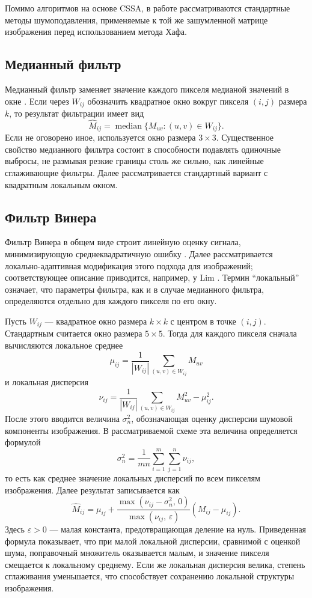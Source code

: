Помимо алгоритмов на основе CSSA, в работе рассматриваются стандартные методы шумоподавления, применяемые к той же зашумленной матрице изображения перед использованием метода Хафа.

\subsection*{Медианный фильтр}

Медианный фильтр заменяет значение каждого пикселя медианой значений в окне \cite{huang1979}. Если через $W_{ij}$ обозначить квадратное окно вокруг пикселя $(i,j)$ размера $k$, то результат фильтрации имеет вид
\[
\widehat{M}_{ij} = \operatorname{median}\{M_{uv} \colon (u,v)\in W_{ij}\}.
\]
Если не оговорено иное, используется окно размера \(3\times 3\).
Существенное свойство медианного фильтра состоит в способности подавлять одиночные выбросы, не размывая резкие границы столь же сильно, как линейные сглаживающие фильтры. Далее рассматривается стандартный вариант с квадратным локальным окном.

\subsection*{Фильтр Винера}

Фильтр Винера в общем виде строит линейную оценку сигнала, минимизирующую среднеквадратичную ошибку \cite{wiener1949}. Далее рассматривается локально-адаптивная модификация этого подхода для изображений; соответствующее описание приводится, например, у Lim \cite{lim1990}. Термин ``локальный'' означает, что параметры фильтра, как и в случае медианного фильтра, определяются отдельно для каждого пикселя по его окну.

Пусть $W_{ij}$ --- квадратное окно размера $k\times k$ с центром в точке $(i,j)$. Стандартным считается окно размера \(5\times 5\). Тогда для каждого пикселя сначала вычисляются локальное среднее
\[
\mu_{ij} = \frac{1}{|W_{ij}|}\sum_{(u,v)\in W_{ij}} M_{uv}
\]
и локальная дисперсия
\[
\nu_{ij} =
\frac{1}{|W_{ij}|}\sum_{(u,v)\in W_{ij}} M_{uv}^2 - \mu_{ij}^2.
\]
После этого вводится величина $\sigma_n^2$, обозначающая оценку дисперсии шумовой компоненты изображения. В рассматриваемой схеме эта величина определяется формулой
\[
\sigma_n^2 = \frac{1}{mn}\sum_{i=1}^{m}\sum_{j=1}^{n} \nu_{ij},
\]
то есть как среднее значение локальных дисперсий по всем пикселям изображения. Далее результат записывается как
\[
\widehat{M}_{ij}
=
\mu_{ij}
+
\frac{\max(\nu_{ij}-\sigma_n^2,\,0)}{\max(\nu_{ij},\,\varepsilon)}
\left(M_{ij}-\mu_{ij}\right).
\]
Здесь $\varepsilon>0$ --- малая константа, предотвращающая деление на нуль. Приведенная формула показывает, что при малой локальной дисперсии, сравнимой с оценкой шума, поправочный множитель оказывается малым, и значение пикселя смещается к локальному среднему. Если же локальная дисперсия велика, степень сглаживания уменьшается, что способствует сохранению локальной структуры изображения.

